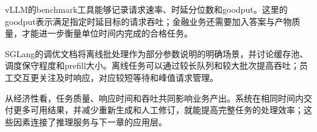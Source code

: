 vLLM的benchmark工具能够记录请求速率、时延分位数和goodput。这里的goodput表示满足指定时延目标的请求吞吐；金融业务还需要加入答案与产物质量，才能进一步衡量单位时间内完成的合格任务。

SGLang的调优文档将离线批处理作为部分参数说明的明确场景，并讨论缓存池、调度保守程度和prefill大小。离线任务可以通过较长队列和较大批次提高吞吐；员工交互更关注及时响应，对应较短等待和峰值请求管理。

从经济性看，任务质量、响应时间和吞吐共同影响业务产出。系统在相同时间内交付更多可用结果，并减少重新生成和人工修订，就能提高完整任务的处理效率；这些因素连接了推理服务与下一章的应用层。

